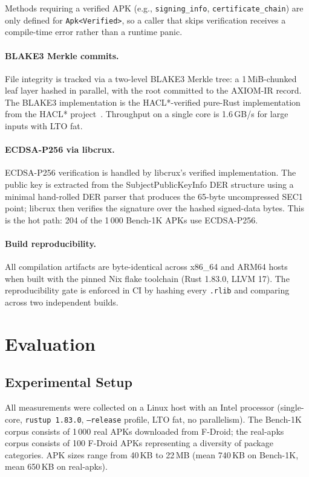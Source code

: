 \documentclass[runningheads]{llncs}
\begin{document}
Methods requiring a verified APK (e.g., \texttt{signing\_info},
\texttt{certificate\_chain}) are only defined for \texttt{Apk<Verified>},
so a caller that skips verification receives a compile-time error rather than
a runtime panic.

\paragraph{BLAKE3 Merkle commits.}
File integrity is tracked via a two-level BLAKE3 Merkle tree:
a 1\,MiB-chunked leaf layer hashed in parallel, with the root committed to
the AXIOM-IR record.  The BLAKE3 implementation is the HACL*-verified
pure-Rust implementation from the HACL* project~\cite{hacl}.  Throughput
on a single core is 1.6\,GB/s for large inputs with LTO fat.

\paragraph{ECDSA-P256 via libcrux.}
ECDSA-P256 verification is handled by libcrux's verified implementation.
The public key is extracted from the SubjectPublicKeyInfo DER structure using
a minimal hand-rolled DER parser that produces the 65-byte uncompressed SEC1
point; libcrux then verifies the signature over the hashed signed-data bytes.
This is the hot path: 204 of the 1\,000 Bench-1K APKs use ECDSA-P256.

\paragraph{Build reproducibility.}
All compilation artifacts are byte-identical across x86\_64 and ARM64 hosts
when built with the pinned Nix flake toolchain (Rust 1.83.0, LLVM 17).
The reproducibility gate is enforced in CI by hashing every \texttt{.rlib} and
comparing across two independent builds.

\section{Evaluation}
\label{sec:eval}

\subsection{Experimental Setup}

All measurements were collected on a Linux host with an Intel processor
(single-core, \texttt{rustup 1.83.0}, \texttt{--release} profile, LTO fat,
no parallelism).  The Bench-1K corpus consists of 1\,000 real APKs downloaded
from F-Droid; the real-apks corpus consists of 100 F-Droid APKs representing
a diversity of package categories.  APK sizes range from 40\,KB to 22\,MB
(mean 740\,KB on Bench-1K, mean 650\,KB on real-apks).
\end{document}
